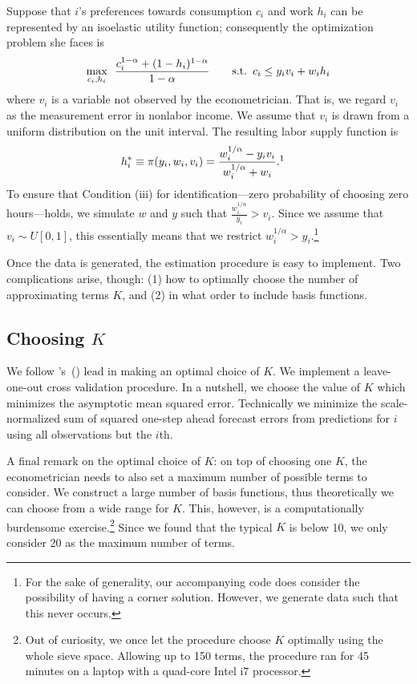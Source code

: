 \documentclass[11pt,letterpaper]{article}                  %
\newcommand\citepos[1]{\citeauthor{#1}'s\ (\citeyear{#1})}
\begin{document}
Suppose that $i$'s preferences towards consumption $c_i$ and work $h_i$ can be represented by an isoelastic utility function; consequently the optimization problem she faces is 
\begin{align*}
	\max_{c_i, h_i} \enskip \frac{c_i^{1-\alpha} + (1-h_i)^{1-\alpha}}{1-\alpha} \qquad \text{s.t.} \enskip c_i \leq y_i v_i + w_i h_i
\end{align*}
where $v_i$ is a variable not observed by the econometrician.
That is, we regard $v_i$ as the measurement error in nonlabor income.
We assume that $v_i$ is drawn from a uniform distribution on the unit interval.
The resulting labor supply function is
\begin{align*}
	h_i^* &\equiv \pi (y_i, w_i, v_i) = \frac{w_i^{1/\alpha} - y_i v_i}{w_i^{1/\alpha} + w_i}.\footnotemark
\end{align*}
To ensure that Condition (iii) for identification---zero probability of choosing zero hours---holds, we simulate $w$ and $y$ such that $\frac{w_i^{1/\alpha}}{y_i} > v_i$.
Since we assume that $v_i \sim U[0, 1]$, this essentially means that we restrict $w_i^{1/\alpha} > y_i$.\footnote{For the sake of generality, our accompanying code does consider the possibility of having a corner solution. However, we generate data such that this never occurs.}

Once the data is generated, the estimation procedure is easy to implement.
Two complications arise, though: (1) how to optimally choose the number of approximating terms $K$, and (2) in what order to include basis functions.

\subsection{Choosing $K$}

We follow \citepos{Blomquist2002} lead in making an optimal choice of $K$.
We implement a leave-one-out cross validation procedure.
In a nutshell, we choose the value of $K$ which minimizes the asymptotic mean squared error.
Technically we minimize the scale-normalized sum of squared one-step ahead forecast errors from predictions for $i$ using all observations but the $i$th.

A final remark on the optimal choice of $K$: on top of choosing one $K$, the econometrician needs to also set a maximum number of possible terms to consider.
We construct a large number of basis functions, thus theoretically we can choose from a wide range for $K$.
This, however, is a computationally burdensome exercise.\footnote{Out of curiosity, we once let the procedure choose $K$ optimally using the whole sieve space. Allowing up to 150 terms, the procedure ran for 45 minutes on a laptop with a quad-core Intel i7 processor.}
Since we found that the typical $K$ is below 10, we only consider 20 as the maximum number of terms.
\end{document}
